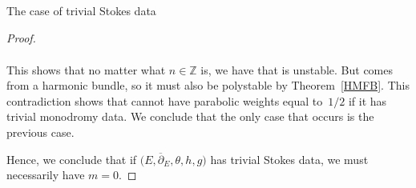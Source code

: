 \documentclass[11pt]{article}
\numberwithin{equation}{section}
\numberwithin{equation}{section}
\begin{document}
\begin{subsubsection}{The case of trivial Stokes data}
\begin{proof}
\begin{itemize}
\begin{gather*}
\end{gather*}
This shows that no matter what $n\in \mathbb{Z}$ is, we have that  is unstable. But  comes from a harmonic bundle, so it must also be polystable by Theorem~\ref{HMFB}. This contradiction shows that  cannot have parabolic weights equal to~$1/2$ if it has trivial monodromy data. We conclude that the only case that occurs is the previous case.
\end{itemize}

Hence, we conclude that if $\bigl(E,\overline{\partial}_E,\theta,h,g\bigr)$ has trivial Stokes data, we must necessarily have $m=0$.
\end{proof}

\end{subsubsection}
\end{document}
